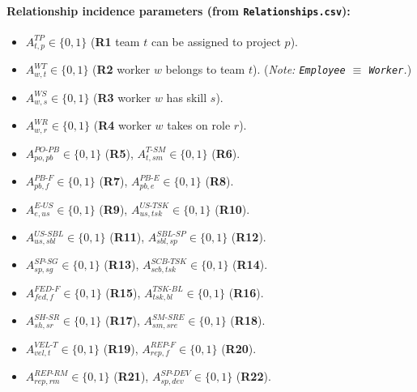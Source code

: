 \documentclass[11pt,a4paper]{article}
\begin{document}
\paragraph{Relationship incidence parameters (from \texttt{Relationships.csv}):}
\begin{itemize}[leftmargin=2em]
  \item $A^{TP}_{t,p}\in\{0,1\}$ (\textbf{R1} team $t$ can be assigned to project $p$).
  \item $A^{WT}_{w,t}\in\{0,1\}$ (\textbf{R2} worker $w$ belongs to team $t$). (\emph{Note: \texttt{Employee} $\equiv$ \texttt{Worker}.})
  \item $A^{WS}_{w,s}\in\{0,1\}$ (\textbf{R3} worker $w$ has skill $s$).
  \item $A^{WR}_{w,r}\in\{0,1\}$ (\textbf{R4} worker $w$ takes on role $r$).
  \item $A^{PO\text{-}PB}_{po,pb}\in\{0,1\}$ (\textbf{R5}), $A^{T\text{-}SM}_{t,sm}\in\{0,1\}$ (\textbf{R6}).
  \item $A^{PB\text{-}F}_{pb,f}\in\{0,1\}$ (\textbf{R7}), $A^{PB\text{-}E}_{pb,e}\in\{0,1\}$ (\textbf{R8}).
  \item $A^{E\text{-}US}_{e,us}\in\{0,1\}$ (\textbf{R9}), $A^{US\text{-}TSK}_{us,tsk}\in\{0,1\}$ (\textbf{R10}).
  \item $A^{US\text{-}SBL}_{us,sbl}\in\{0,1\}$ (\textbf{R11}), $A^{SBL\text{-}SP}_{sbl,sp}\in\{0,1\}$ (\textbf{R12}).
  \item $A^{SP\text{-}SG}_{sp,sg}\in\{0,1\}$ (\textbf{R13}), $A^{SCB\text{-}TSK}_{scb,tsk}\in\{0,1\}$ (\textbf{R14}).
  \item $A^{FED\text{-}F}_{fed,f}\in\{0,1\}$ (\textbf{R15}), $A^{TSK\text{-}BL}_{tsk,bl}\in\{0,1\}$ (\textbf{R16}).
  \item $A^{SH\text{-}SR}_{sh,sr}\in\{0,1\}$ (\textbf{R17}), $A^{SM\text{-}SRE}_{sm,sre}\in\{0,1\}$ (\textbf{R18}).
  \item $A^{VEL\text{-}T}_{vel,t}\in\{0,1\}$ (\textbf{R19}), $A^{REP\text{-}F}_{rep,f}\in\{0,1\}$ (\textbf{R20}).
  \item $A^{REP\text{-}RM}_{rep,rm}\in\{0,1\}$ (\textbf{R21}), $A^{SP\text{-}DEV}_{sp,dev}\in\{0,1\}$ (\textbf{R22}).
\end{itemize}

\end{document}
